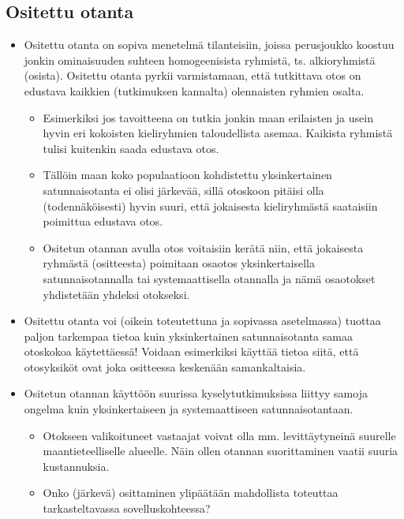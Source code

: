 \documentclass[
]{book}
\providecommand{\tightlist}{%
  \setlength{\itemsep}{0pt}\setlength{\parskip}{0pt}}
\begin{document}
\hypertarget{ositettu-otanta}{%
\subsection{Ositettu otanta}\label{ositettu-otanta}}

\begin{itemize}
\tightlist
\item
  Ositettu otanta on sopiva menetelmä tilanteisiin, joissa perusjoukko koostuu jonkin ominaisuuden suhteen homogeenisista ryhmistä, ts. alkioryhmistä (osista). Ositettu otanta pyrkii varmistamaan, että tutkittava otos on edustava kaikkien (tutkimuksen kannalta) olennaisten ryhmien osalta.

  \begin{itemize}
  \tightlist
  \item
    Esimerkiksi jos tavoitteena on tutkia jonkin maan erilaisten ja usein hyvin eri kokoisten kieliryhmien taloudellista asemaa. Kaikista ryhmistä tulisi kuitenkin saada edustava otos.
  \item
    Tällöin maan koko populaatioon kohdistettu yksinkertainen satunnaisotanta ei olisi järkevää, sillä otoskoon pitäisi olla (todennäköisesti) hyvin suuri, että jokaisesta kieliryhmästä saataisiin poimittua edustava otos.
  \item
    Ositetun otannan avulla otos voitaisiin kerätä niin, että jokaisesta ryhmästä (ositteesta) poimitaan osaotos yksinkertaisella satunnaisotannalla tai systemaattisella otannalla ja nämä osaotokset yhdistetään yhdeksi otokseksi.
  \end{itemize}
\item
  Ositettu otanta voi (oikein toteutettuna ja sopivassa asetelmassa) tuottaa paljon tarkempaa tietoa kuin yksinkertainen satunnaisotanta samaa otoskokoa käytettäessä! Voidaan esimerkiksi käyttää tietoa siitä, että otosyksiköt ovat joka ositteessa keskenään samankaltaisia.
\item
  Ositetun otannan käyttöön suurissa kyselytutkimuksissa liittyy samoja ongelma kuin yksinkertaiseen ja systemaattiseen satunnaisotantaan.

  \begin{itemize}
  \tightlist
  \item
    Otokseen valikoituneet vastaajat voivat olla mm. levittäytyneinä suurelle maantieteelliselle alueelle. Näin ollen otannan suorittaminen vaatii suuria kustannuksia.
  \item
    Onko (järkevä) osittaminen ylipäätään mahdollista toteuttaa tarkasteltavassa sovelluskohteessa?
  \end{itemize}
\end{itemize}
\end{document}

